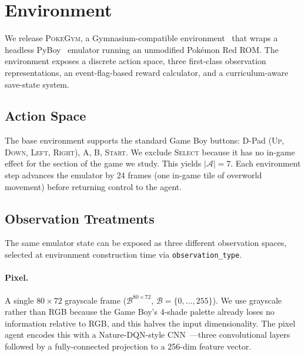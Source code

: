 \section{Environment}
\label{sec:environment}

We release \textsc{PokeGym}, a Gymnasium-compatible
environment~\citep{gymnasium} that wraps a headless
PyBoy~\citep{pyboy} emulator running an unmodified Pok\'emon Red ROM.
The environment exposes a discrete action space, three first-class
observation representations, an event-flag-based reward calculator, and
a curriculum-aware save-state system.

\subsection{Action Space}
The base environment supports the standard Game Boy buttons: D-Pad
(\textsc{Up}, \textsc{Down}, \textsc{Left}, \textsc{Right}),
\textsc{A}, \textsc{B}, \textsc{Start}.  We exclude \textsc{Select}
because it has no in-game effect for the section of the game we
study.  This yields $|\mathcal{A}| = 7$.  Each environment step
advances the emulator by 24 frames (one in-game tile of overworld
movement) before returning control to the agent.

\subsection{Observation Treatments}
\label{sec:obs-treatments}

The same emulator state can be exposed as three different observation
spaces, selected at environment construction time via
\texttt{observation\_type}.

\paragraph{Pixel.}
A single $80 \times 72$ grayscale frame ($\mathcal{B}^{80 \times 72}$,
$\mathcal{B} = \{0, \ldots, 255\}$).  We use grayscale rather than RGB
because the Game Boy's 4-shade palette already loses no information
relative to RGB, and this halves the input dimensionality.  The pixel
agent encodes this with a Nature-DQN-style
CNN~\citep{mnih2015atari}---three convolutional layers followed by a
fully-connected projection to a 256-dim feature vector.

